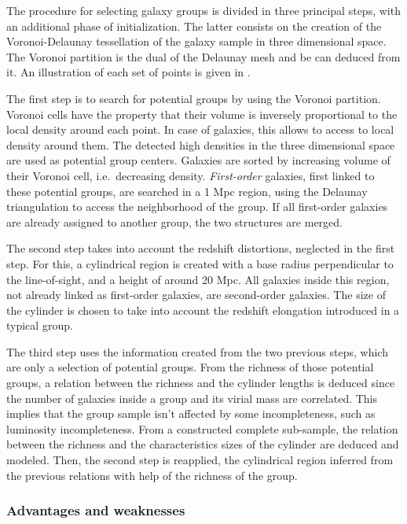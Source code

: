 The procedure for selecting galaxy groups is divided in three principal steps,
with an additional phase of initialization. The latter consists on the creation
of the Voronoi-Delaunay tessellation of the galaxy sample in three dimensional
space. The Voronoi partition is the dual of the Delaunay mesh and be can
deduced from it. An illustration of each set of points is given in
.

The first step is to search for potential groups by using the Voronoi
partition. Voronoi cells have the property that their volume is inversely
proportional to the local density around each point. In case of galaxies,
this allows to access to local density around them. The detected high densities
in the three dimensional space are used as potential group centers. Galaxies
are sorted by increasing volume of their Voronoi cell, i.e.\ decreasing
density. \emph{First-order} galaxies, first linked to these potential groups,
are searched in a 1 Mpc region, using the Delaunay triangulation to access the
neighborhood of the group. If all first-order galaxies are already assigned to
another group, the two structures are merged.

The second step takes into account the redshift distortions, neglected in the
first step. For this, a cylindrical region is created with a base radius
perpendicular to the line-of-sight, and a height of around 20 Mpc. All galaxies
inside this region, not already linked as first-order galaxies, are
second-order galaxies. The size of the cylinder is chosen to take into account
the redshift elongation introduced in a typical group.

The third step uses the information created from the two previous steps, which
are only a selection of potential groups. From the richness of those potential
groups, a relation between the richness and the cylinder lengths is deduced
since the number of galaxies inside a group and its virial mass are correlated.
This implies that the group sample isn't affected by some incompleteness, such
as luminosity incompleteness. From a constructed complete sub-sample, the
relation between the richness and the characteristics sizes of the cylinder are
deduced and modeled. Then, the second step is reapplied, the cylindrical region
inferred from the previous relations with help of the richness of the group.

\subsubsection{Advantages and weaknesses}
\label{ssub:advantages}

